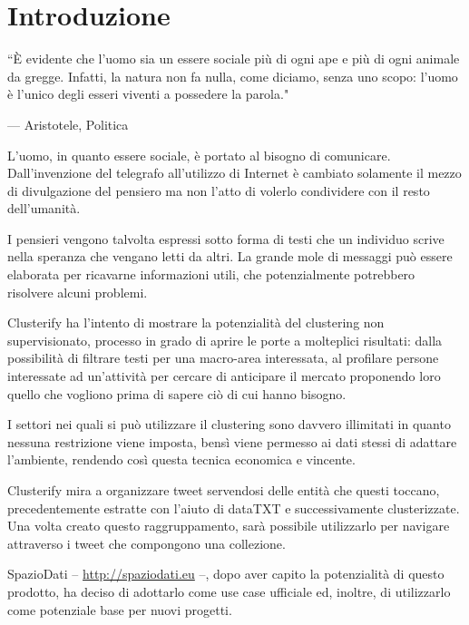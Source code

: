 \chapter{Introduzione}

\epigraph{``È evidente che l’uomo sia un essere sociale più di ogni ape e più di ogni animale da gregge. Infatti, la natura non fa nulla, come diciamo, senza uno scopo: l’uomo è l’unico degli esseri viventi a possedere la parola."}{--- \textup{Aristotele}, Politica }

L'uomo, in quanto essere sociale, è portato al bisogno di comunicare. Dall'invenzione del telegrafo all'utilizzo di Internet è cambiato solamente il mezzo di divulgazione del pensiero ma non l'atto di volerlo condividere con il resto dell'umanità.

I pensieri vengono talvolta espressi sotto forma di testi che un individuo scrive nella speranza che vengano letti da altri. La grande mole di messaggi può essere elaborata per ricavarne informazioni utili, che potenzialmente potrebbero risolvere alcuni problemi.

Clusterify ha l'intento di mostrare la potenzialità del clustering non supervisionato, processo in grado di aprire le porte a molteplici risultati: dalla possibilità di filtrare testi per una macro-area interessata, al profilare persone interessate ad un'attività per cercare di anticipare il mercato proponendo loro quello che vogliono prima di sapere ciò di cui hanno bisogno.

 I settori nei quali si può utilizzare il clustering sono davvero illimitati in quanto nessuna restrizione viene imposta, bensì viene permesso ai dati stessi di adattare l'ambiente, rendendo così questa tecnica economica e vincente.

Clusterify mira a organizzare tweet servendosi delle entità che questi toccano, precedentemente estratte con l'aiuto di dataTXT e successivamente clusterizzate. Una volta creato questo raggruppamento, sarà possibile utilizzarlo per navigare attraverso i tweet che compongono una collezione. 

SpazioDati -- \url{http://spaziodati.eu} --, dopo aver capito la potenzialità di questo prodotto, ha deciso di adottarlo come use case ufficiale ed, inoltre, di utilizzarlo come potenziale base per nuovi progetti.